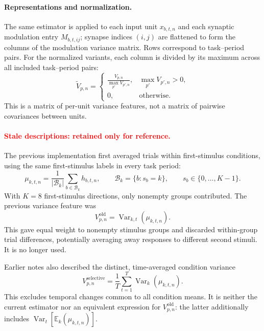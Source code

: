 \documentclass{article}
\begin{document}
\paragraph{Representations and normalization.}
The same estimator is applied to each input unit $x_{b,t,n}$ and each
synaptic modulation entry $M_{b,t,ij}$; synapse indices $(i,j)$ are flattened
to form the columns of the modulation variance matrix. Rows correspond to
task--period pairs. For the normalized variants, each column is divided by
its maximum across all included task--period pairs:
\begin{equation}
    \widetilde{V}_{p,n}
    = \begin{cases}
        \displaystyle\frac{V_{p,n}}{\max_{p'}V_{p',n}},
            & \max_{p'}V_{p',n}>0, \\
        0, & \text{otherwise}.
      \end{cases}
\end{equation}
This is a matrix of per-unit variance features, not a matrix of pairwise
covariances between units.

\paragraph{\textcolor{red}{Stale descriptions: retained only for reference.}}
The previous implementation first averaged trials within first-stimulus
conditions, using the same first-stimulus labels in every task period:
\begin{equation}
    \mu_{k,t,n}
    = \frac{1}{|\mathcal{B}_k|}
      \sum_{b\in\mathcal{B}_k}h_{b,t,n},
    \qquad \mathcal{B}_k=\{b:s_b=k\},
    \qquad s_b\in\{0,\ldots,K-1\}.
\end{equation}
With $K=8$ first-stimulus directions, only nonempty groups contributed.
The previous variance feature was
\begin{equation}
    V^{\mathrm{old}}_{p,n}
    = \operatorname{Var}_{k,t}(\mu_{k,t,n}).
\end{equation}
This gave equal weight to nonempty stimulus groups and discarded
within-group trial differences, potentially averaging away responses to
different second stimuli. It is no longer used.

Earlier notes also described the distinct, time-averaged condition variance
\begin{equation}\label{mean_of_var}
    V^{\mathrm{selective}}_{p,n}
    = \frac{1}{T}\sum_{t=1}^{T}
      \operatorname{Var}_{k}(\mu_{k,t,n}).
\end{equation}
This excludes temporal changes common to all condition means. It is
neither the current estimator nor an equivalent expression for
$V^{\mathrm{old}}_{p,n}$: the latter additionally includes
$\operatorname{Var}_{t}[\mathbb{E}_{k}(\mu_{k,t,n})]$.
\end{document}
